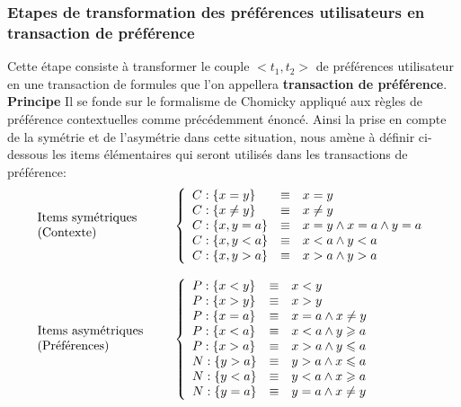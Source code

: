 \documentclass[a4paper,12pt,openany,oneside]{article}
\begin{document}
     
    \subsubsection{Etapes de transformation des préférences utilisateurs en transaction de préférence}
    
       Cette étape consiste à transformer le couple $<t_{1},t_{2}>$ de préférences utilisateur en une transaction de formules que l'on appellera \textbf{transaction de préférence}.\\ 
       \textbf{Principe}
       Il se fonde sur le formalisme de Chomicky appliqué aux règles de préférence contextuelles comme précédemment énoncé. Ainsi la prise en compte de la symétrie et de l'asymétrie dans cette situation, nous amène à définir ci-dessous les items élémentaires qui seront utilisés dans les transactions de préférence:\\
 
 
       \[
       \begin{array}{l l}
       \parbox{3.5cm}{Items symétriques\\ (Contexte)}&
 	  \left\{
 		  \begin{array}{l c l}
 		     C:\{x=y\}&\equiv& x=y\\
 		     C:\{x\neq y\}&\equiv& x\neq y\\
 		   	 C:\{x,y=a\}&\equiv& x=y\wedge x=a\wedge y=a\\
 		   	 C:\{x,y<a\}&\equiv& x<a\wedge y<a\\
 		   	 C:\{x,y>a\}&\equiv& x>a\wedge y>a
 	   	 \end{array}
    	 \right.\\
 	&\\
       \parbox{3.5cm}{Items asymétriques\\ (Préférences)}&
 	  \left\{
 		  \begin{array}{l c l}   	 
 		   	 P:\{x<y\}&\equiv& x<y\\
 		   	 P:\{x>y\}&\equiv& x>y\\
 		   	 P:\{x=a\} &\equiv& x=a \wedge x\neq y \\
 		   	 P:\{x<a\} &\equiv& x<a \wedge y\geqslant a\\
 			 P:\{x>a\} &\equiv& x>a \wedge y\leqslant a\\
 			 
 			 N:\{y>a\} &\equiv& y>a \wedge x\leqslant a\\
 			 N:\{y<a\} &\equiv& y<a \wedge x\geqslant a\\
 		   	 N:\{y=a\} &\equiv& y=a \wedge x\neq y\\	 
 	   	 \end{array}
    	 \right.
    	 \end{array}
    	 \]		   	 	 		 
 	 
\end{document}
